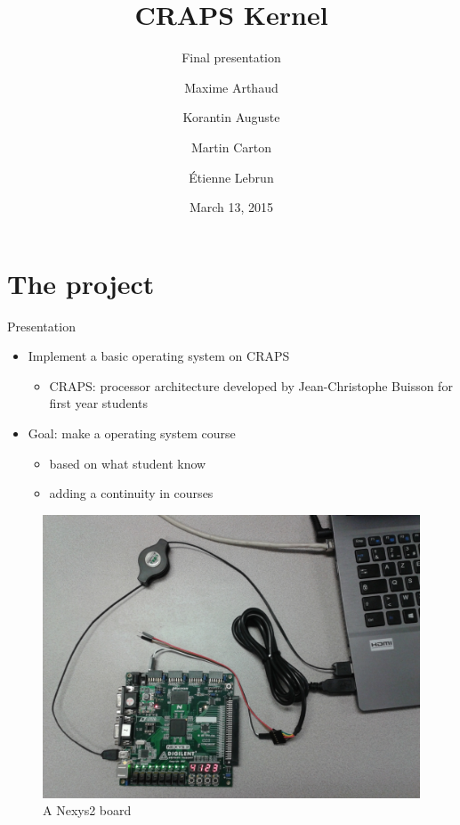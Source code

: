 \documentclass{beamer}
\title{CRAPS Kernel}
\subtitle{Final presentation}
\author{
       Maxime Arthaud
  \and Korantin Auguste
  \and Martin Carton
  \and Étienne Lebrun
}
\date{March 13, 2015}
\begin{document}
  \begin{frame}
    \titlepage%
  \end{frame}

  \section{The project}
    \begin{frame}{Presentation}
      \begin{itemize}
        \item Implement a basic operating system on CRAPS
          \begin{itemize}
            \item CRAPS: processor architecture developed by Jean-Christophe
              Buisson for first year students
          \end{itemize}
        \item Goal: make a operating system course
          \begin{itemize}
            \item based on what student know
            \item adding a continuity in courses
          \end{itemize}
      \end{itemize}
    \end{frame}

    \begin{frame}
      \begin{figure}
        \centering
        \includegraphics[width=\textwidth, keepaspectratio]{fig/Nexys2.jpg}
        \caption{A Nexys2 board}
      \end{figure}
    \end{frame}
\end{document}
